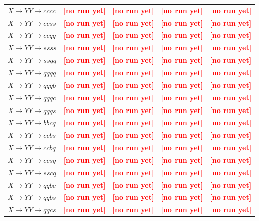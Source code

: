\documentclass[12pt]{article}   %
\newcommand{\pending}[1]{\textcolor{red}{\textbf{[#1]}}}
\begin{document}
\begin{landscape}
{\begin{longtable}{@{\extracolsep{\fill}}lcccc@{}}
$X\to YY\to cccc$ & \pending{no run yet} & \pending{no run yet} & \pending{no run yet} & \pending{no run yet} \\
$X\to YY\to ccss$ & \pending{no run yet} & \pending{no run yet} & \pending{no run yet} & \pending{no run yet} \\
$X\to YY\to ccqq$ & \pending{no run yet} & \pending{no run yet} & \pending{no run yet} & \pending{no run yet} \\
$X\to YY\to ssss$ & \pending{no run yet} & \pending{no run yet} & \pending{no run yet} & \pending{no run yet} \\
$X\to YY\to ssqq$ & \pending{no run yet} & \pending{no run yet} & \pending{no run yet} & \pending{no run yet} \\
$X\to YY\to qqqq$ & \pending{no run yet} & \pending{no run yet} & \pending{no run yet} & \pending{no run yet} \\
$X\to YY\to qqqb$ & \pending{no run yet} & \pending{no run yet} & \pending{no run yet} & \pending{no run yet} \\
$X\to YY\to qqqc$ & \pending{no run yet} & \pending{no run yet} & \pending{no run yet} & \pending{no run yet} \\
$X\to YY\to qqqs$ & \pending{no run yet} & \pending{no run yet} & \pending{no run yet} & \pending{no run yet} \\
$X\to YY\to bbcq$ & \pending{no run yet} & \pending{no run yet} & \pending{no run yet} & \pending{no run yet} \\
$X\to YY\to ccbs$ & \pending{no run yet} & \pending{no run yet} & \pending{no run yet} & \pending{no run yet} \\
$X\to YY\to ccbq$ & \pending{no run yet} & \pending{no run yet} & \pending{no run yet} & \pending{no run yet} \\
$X\to YY\to ccsq$ & \pending{no run yet} & \pending{no run yet} & \pending{no run yet} & \pending{no run yet} \\
$X\to YY\to sscq$ & \pending{no run yet} & \pending{no run yet} & \pending{no run yet} & \pending{no run yet} \\
$X\to YY\to qqbc$ & \pending{no run yet} & \pending{no run yet} & \pending{no run yet} & \pending{no run yet} \\
$X\to YY\to qqbs$ & \pending{no run yet} & \pending{no run yet} & \pending{no run yet} & \pending{no run yet} \\
$X\to YY\to qqcs$ & \pending{no run yet} & \pending{no run yet} & \pending{no run yet} & \pending{no run yet} \\

\end{longtable}}
\end{landscape}
\end{document}

